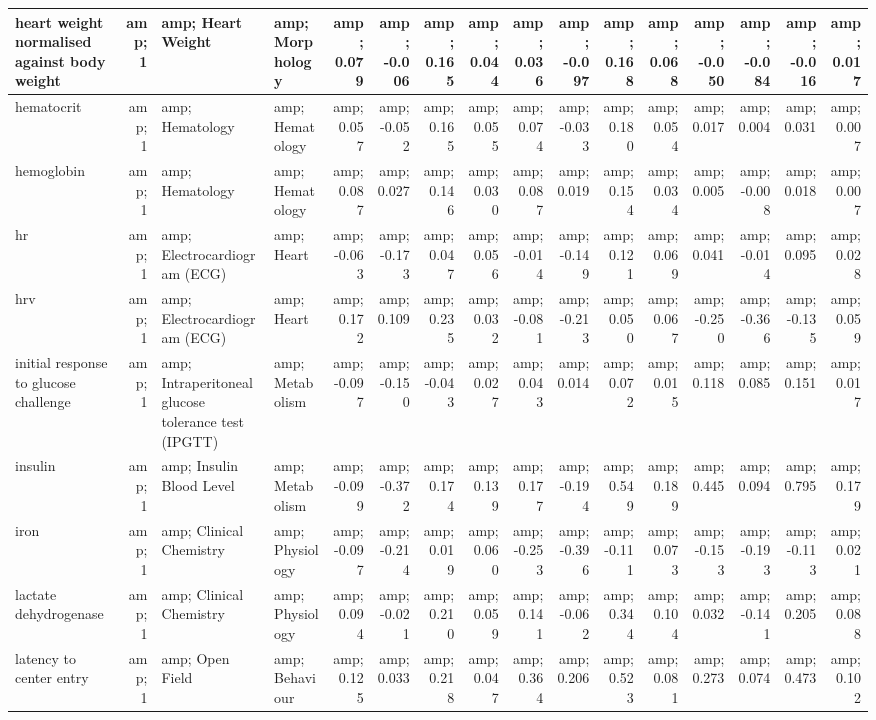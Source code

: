 \documentclass[]{article}
\begin{document}
\begin{table}
\begin{tabular}[t]{l|r|l|l|r|r|r|r|r|r|r|r|r|r|r|r}
\hline
heart weight normalised against body weight &amp; 1 &amp; Heart Weight &amp; Morphology &amp; 0.079 &amp; -0.006 &amp; 0.165 &amp; 0.044 &amp; 0.036 &amp; -0.097 &amp; 0.168 &amp; 0.068 &amp; -0.050 &amp; -0.084 &amp; -0.016 &amp; 0.017\\
\hline
hematocrit &amp; 1 &amp; Hematology &amp; Hematology &amp; 0.057 &amp; -0.052 &amp; 0.165 &amp; 0.055 &amp; 0.074 &amp; -0.033 &amp; 0.180 &amp; 0.054 &amp; 0.017 &amp; 0.004 &amp; 0.031 &amp; 0.007\\
\hline
hemoglobin &amp; 1 &amp; Hematology &amp; Hematology &amp; 0.087 &amp; 0.027 &amp; 0.146 &amp; 0.030 &amp; 0.087 &amp; 0.019 &amp; 0.154 &amp; 0.034 &amp; 0.005 &amp; -0.008 &amp; 0.018 &amp; 0.007\\
\hline
hr &amp; 1 &amp; Electrocardiogram (ECG) &amp; Heart &amp; -0.063 &amp; -0.173 &amp; 0.047 &amp; 0.056 &amp; -0.014 &amp; -0.149 &amp; 0.121 &amp; 0.069 &amp; 0.041 &amp; -0.014 &amp; 0.095 &amp; 0.028\\
\hline
hrv &amp; 1 &amp; Electrocardiogram (ECG) &amp; Heart &amp; 0.172 &amp; 0.109 &amp; 0.235 &amp; 0.032 &amp; -0.081 &amp; -0.213 &amp; 0.050 &amp; 0.067 &amp; -0.250 &amp; -0.366 &amp; -0.135 &amp; 0.059\\
\hline
initial response to glucose challenge &amp; 1 &amp; Intraperitoneal glucose tolerance test (IPGTT) &amp; Metabolism &amp; -0.097 &amp; -0.150 &amp; -0.043 &amp; 0.027 &amp; 0.043 &amp; 0.014 &amp; 0.072 &amp; 0.015 &amp; 0.118 &amp; 0.085 &amp; 0.151 &amp; 0.017\\
\hline
insulin &amp; 1 &amp; Insulin Blood Level &amp; Metabolism &amp; -0.099 &amp; -0.372 &amp; 0.174 &amp; 0.139 &amp; 0.177 &amp; -0.194 &amp; 0.549 &amp; 0.189 &amp; 0.445 &amp; 0.094 &amp; 0.795 &amp; 0.179\\
\hline
iron &amp; 1 &amp; Clinical Chemistry &amp; Physiology &amp; -0.097 &amp; -0.214 &amp; 0.019 &amp; 0.060 &amp; -0.253 &amp; -0.396 &amp; -0.111 &amp; 0.073 &amp; -0.153 &amp; -0.193 &amp; -0.113 &amp; 0.021\\
\hline
lactate dehydrogenase &amp; 1 &amp; Clinical Chemistry &amp; Physiology &amp; 0.094 &amp; -0.021 &amp; 0.210 &amp; 0.059 &amp; 0.141 &amp; -0.062 &amp; 0.344 &amp; 0.104 &amp; 0.032 &amp; -0.141 &amp; 0.205 &amp; 0.088\\
\hline
latency to center entry &amp; 1 &amp; Open Field &amp; Behaviour &amp; 0.125 &amp; 0.033 &amp; 0.218 &amp; 0.047 &amp; 0.364 &amp; 0.206 &amp; 0.523 &amp; 0.081 &amp; 0.273 &amp; 0.074 &amp; 0.473 &amp; 0.102\\

\end{tabular}
\end{table}
\end{document}
